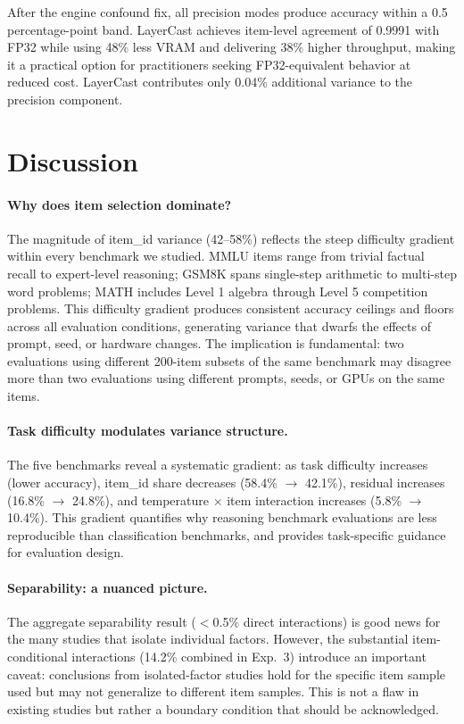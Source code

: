 \documentclass[letterpaper,11pt]{article}
\begin{document}
After the engine confound fix, all precision modes produce accuracy within a 0.5 percentage-point band.
LayerCast achieves item-level agreement of 0.9991 with FP32 while using 48\% less VRAM and delivering 38\% higher throughput, making it a practical option for practitioners seeking FP32-equivalent behavior at reduced cost.
LayerCast contributes only 0.04\% additional variance to the precision component.

\section{Discussion}

\paragraph{Why does item selection dominate?}
The magnitude of item\_id variance (42--58\%) reflects the steep difficulty gradient within every benchmark we studied.
MMLU items range from trivial factual recall to expert-level reasoning; GSM8K spans single-step arithmetic to multi-step word problems; MATH includes Level 1 algebra through Level 5 competition problems.
This difficulty gradient produces consistent accuracy ceilings and floors across all evaluation conditions, generating variance that dwarfs the effects of prompt, seed, or hardware changes.
The implication is fundamental: two evaluations using different 200-item subsets of the same benchmark may disagree more than two evaluations using different prompts, seeds, or GPUs on the same items.

\paragraph{Task difficulty modulates variance structure.}
The five benchmarks reveal a systematic gradient: as task difficulty increases (lower accuracy), item\_id share decreases (58.4\% $\to$ 42.1\%), residual increases (16.8\% $\to$ 24.8\%), and temperature $\times$ item interaction increases (5.8\% $\to$ 10.4\%).
This gradient quantifies why reasoning benchmark evaluations are less reproducible than classification benchmarks, and provides task-specific guidance for evaluation design.

\paragraph{Separability: a nuanced picture.}
The aggregate separability result ($<$0.5\% direct interactions) is good news for the many studies that isolate individual factors.
However, the substantial item-conditional interactions (14.2\% combined in Exp.~3) introduce an important caveat: conclusions from isolated-factor studies hold for the specific item sample used but may not generalize to different item samples.
This is not a flaw in existing studies but rather a boundary condition that should be acknowledged.
\end{document}
